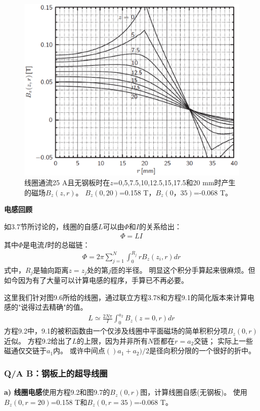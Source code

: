 \begin{figure}
	\centering
	\includegraphics[scale=0.5]{chpt9/figs/fig9.7.eps}
	\caption{线圈通流25 A且无钢板时在$z$=0,5,7.5,10,12.5,15,17.5和20 mm时产生的磁场$B_z(z,r)$。
		$B_z(0,20)$=0.158 T，$B_z(0，35)$=-0.068 T。}
\end{figure}

\textbf{电感回顾}

如3.7节所讨论的，线圈的自感$L$可以由$\Phi$和$I$的关系给出：
\begin{align*}%
\Phi=LI \tag{3.78}
\end{align*}
其中$\Phi$是电流$I$时的总磁链：
\begin{align*}%
\Phi=2\pi\sum_{j=1}^{N}\int_{0}^{R_j}rB_z(z_i,r)dr \tag{9.1}
\end{align*}
式中，$R_j$是轴向距离$z=z_j$处的第$j$匝的半径。
明显这个积分手算起来很麻烦。但如今因为有了大量可以计算电感的程序，手算已不再必要。

这里我们针对图9.6所给的线圈，通过联立方程3.78和方程9.1的简化版本来计算电感的"说得过去精确"的值。
\begin{align*}%
L\simeq\frac{2N\pi}{I}\int_{0}^{a_2}B_z(z=0,r)dr \tag{9.2}
\end{align*}
方程9.2中，9.1的被积函数由一个仅涉及线圈中平面磁场的简单积积分项$B_z(0,r)$近似。
方程9.2给出了$L$的上限，因为并非所有$N$匝都在$r=a_2$交链；
实际上一些磁通仅交链于$a_1$内。
或许中间点$()a_1+a_2)/2$是径向积分限的一个很好的折中。


\subsubsection{Q/A B：钢板上的超导线圈}
\textbf{a) 线圈电感}\qquad 使用方程9.2和图9.7的$B_z(0,r)$图，计算线圈自感(无钢板)。
使用$B_z(0,r=20)$=0.158 T和$B_z(0,r=35)$=-0.068 T。

